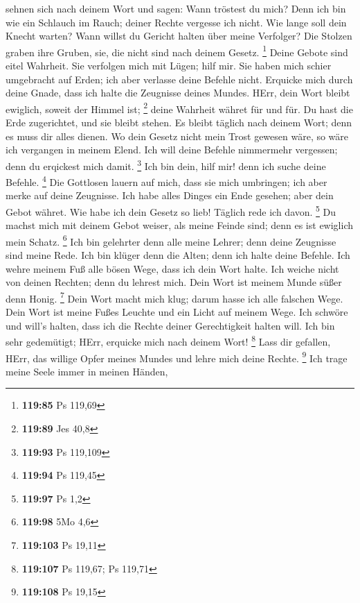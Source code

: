 sehnen sich nach deinem Wort und sagen: Wann tröstest du mich?
 Denn ich bin wie ein Schlauch im Rauch; deiner Rechte
vergesse ich nicht.  Wie lange soll dein Knecht warten?
Wann willst du Gericht halten über meine Verfolger?  Die
Stolzen graben ihre Gruben, sie, die nicht sind nach deinem Gesetz.
\footnote{\textbf{119:85} Ps 119,69}  Deine Gebote sind
eitel Wahrheit. Sie verfolgen mich mit Lügen; hilf mir. 
Sie haben mich schier umgebracht auf Erden; ich aber verlasse deine
Befehle nicht.  Erquicke mich durch deine Gnade, dass ich
halte die Zeugnisse deines Mundes.  HErr, dein Wort bleibt
ewiglich, soweit der Himmel ist; \footnote{\textbf{119:89} Jes 40,8}
 deine Wahrheit währet für und für. Du hast die Erde
zugerichtet, und sie bleibt stehen.  Es bleibt täglich nach
deinem Wort; denn es muss dir alles dienen.  Wo dein Gesetz
nicht mein Trost gewesen wäre, so wäre ich vergangen in meinem Elend.
 Ich will deine Befehle nimmermehr vergessen; denn du
erqickest mich damit. \footnote{\textbf{119:93} Ps 119,109}
 Ich bin dein, hilf mir! denn ich suche deine Befehle.
\footnote{\textbf{119:94} Ps 119,45}  Die Gottlosen lauern
auf mich, dass sie mich umbringen; ich aber merke auf deine Zeugnisse.
 Ich habe alles Dinges ein Ende gesehen; aber dein Gebot
währet.  Wie habe ich dein Gesetz so lieb! Täglich rede ich
davon. \footnote{\textbf{119:97} Ps 1,2}  Du machst mich
mit deinem Gebot weiser, als meine Feinde sind; denn es ist ewiglich
mein Schatz. \footnote{\textbf{119:98} 5Mo 4,6}  Ich bin
gelehrter denn alle meine Lehrer; denn deine Zeugnisse sind meine Rede.
 Ich bin klüger denn die Alten; denn ich halte deine
Befehle.  Ich wehre meinem Fuß alle bösen Wege, dass ich
dein Wort halte.  Ich weiche nicht von deinen Rechten;
denn du lehrest mich.  Dein Wort ist meinem Munde süßer
denn Honig. \footnote{\textbf{119:103} Ps 19,11}  Dein
Wort macht mich klug; darum hasse ich alle falschen Wege. 
Dein Wort ist meine Fußes Leuchte und ein Licht auf meinem Wege.
 Ich schwöre und will's halten, dass ich die Rechte deiner
Gerechtigkeit halten will.  Ich bin sehr gedemütigt; HErr,
erquicke mich nach deinem Wort! \footnote{\textbf{119:107} Ps 119,67; Ps
  119,71}  Lass dir gefallen, HErr, das willige Opfer
meines Mundes und lehre mich deine Rechte. \footnote{\textbf{119:108} Ps
  19,15}  Ich trage meine Seele immer in meinen Händen,
